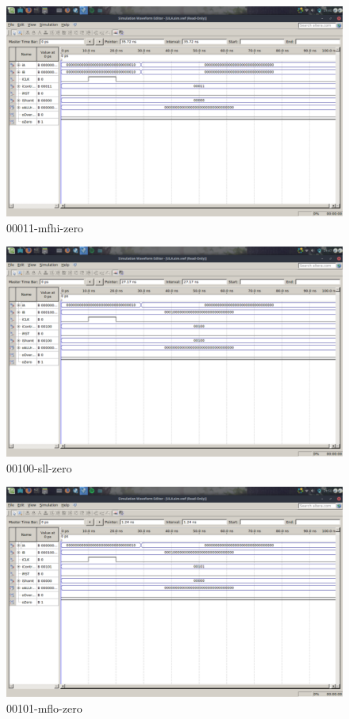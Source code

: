 \documentclass[12pt]{article}
\begin{document}
\begin{figure}[H]
	\centering
	\includegraphics[width=.8\textwidth]{00011-mfhi-zero.png}
	\caption{00011-mfhi-zero}
	\label{fig:00011-mfhi-zero}
\end{figure}

\begin{figure}[H]
	\centering
	\includegraphics[width=.8\textwidth]{00100-sll-zero.png}
	\caption{00100-sll-zero}
	\label{fig:00100-sll-zero}
\end{figure}

\begin{figure}[H]
	\centering
	\includegraphics[width=.8\textwidth]{00101-mflo-zero.png}
	\caption{00101-mflo-zero}
	\label{fig:00101-mflo-zero}
\end{figure}
\end{document}

